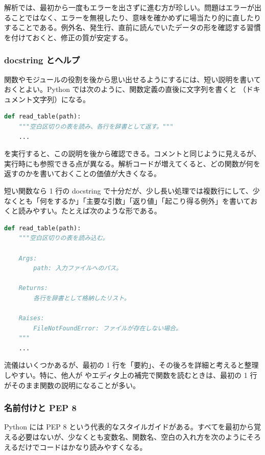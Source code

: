 解析では、最初から一度もエラーを出さずに進む方が珍しい。問題はエラーが出ることではなく、エラーを無視したり、意味を確かめずに場当たり的に直したりすることである。例外名、発生行、直前に読んでいたデータの形を確認する習慣を付けておくと、修正の質が安定する。

\subsubsection{docstring とヘルプ}

関数やモジュールの役割を後から思い出せるようにするには、短い説明を書いておくとよい。Python では次のように、関数定義の直後に文字列を書くと （ドキュメント文字列）になる。

\begin{lstlisting}[language=Python]
def read_table(path):
    """空白区切りの表を読み、各行を辞書として返す。"""
    ...
\end{lstlisting}

 を実行すると、この説明を後から確認できる。コメントと同じように見えるが、実行時にも参照できる点が異なる。解析コードが増えてくると、どの関数が何を返すのかを書いておくことの価値が大きくなる。

短い関数なら 1 行の docstring で十分だが、少し長い処理では複数行にして、少なくとも「何をするか」「主要な引数」「返り値」「起こり得る例外」を書いておくと読みやすい。たとえば次のような形である。

\begin{lstlisting}[language=Python]
def read_table(path):
    """空白区切りの表を読み込む。

    Args:
        path: 入力ファイルへのパス。

    Returns:
        各行を辞書として格納したリスト。

    Raises:
        FileNotFoundError: ファイルが存在しない場合。
    """
    ...
\end{lstlisting}

流儀はいくつかあるが、最初の 1 行を「要約」、その後ろを詳細と考えると整理しやすい。特に、他人が  やエディタ上の補完で関数を読むときは、最初の 1 行がそのまま関数の説明になることが多い。

\subsubsection{名前付けと PEP 8}

Python には PEP 8 という代表的なスタイルガイドがある。すべてを最初から覚える必要はないが、少なくとも変数名、関数名、空白の入れ方を次のようにそろえるだけでコードはかなり読みやすくなる。

